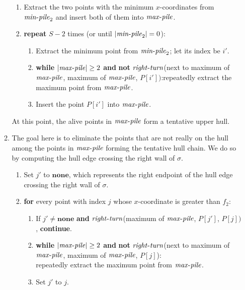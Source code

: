 \documentclass[final,onetabnum,onefignum,onethmnum]{siamltex}
\newcommand{\MinTwo}{\mbox{$\mathit{min}\mbox{\rm -}\mathit{pile}_2$}}
\newcommand{\MaxPile}{\mbox{$\mathit{max}\mbox{\rm -}\mathit{pile}$}}
\begin{document}
\begin{enumerate}
\begin{enumerate}
\begin{enumerate}
\item Extract the two points with the minimum $x$-coordinates 
from \MinTwo{} and insert both of them into \MaxPile{}.
\item \textbf{repeat} $S-2$ times (or until $|\MinTwo{}| = 0$): 
\begin{enumerate}
\item Extract the minimum point from \MinTwo{}; let its index be $i'$.
\item \textbf{while}  $|\MaxPile{}| \geq 2$
  \textbf{and} \textbf{not} $\mathit{right}\mbox{\rm
    -}\mathit{turn}$(next to maximum of \MaxPile{},  maximum of \MaxPile{}, $P[i'])$:\newline \hspace*{1.25em}repeatedly extract the maximum point from \MaxPile{}.
\item Insert the point $P[i']$ into \MaxPile{}.
\end{enumerate}
\end{enumerate}

At this point, the alive points in \MaxPile{} form a tentative upper hull.  

\item The goal here is to eliminate the points that are not really on the hull
among the points in \MaxPile{} forming the tentative hull chain. We do so by 
computing the hull edge crossing the right wall of $\sigma$.

\begin{enumerate}
\item Set $j'$ to $\mathbf{none}$, which represents the right endpoint of the hull edge crossing the right wall of $\sigma$.
\item \textbf{for} every point with index $j$ whose $x$-coordinate is
  greater than $f_2$:

\begin{enumerate}
\item If $j' \neq \mathbf{none}$ \textbf{and} $\mathit{right}\mbox{\rm
    -}\mathit{turn}$(maximum of \MaxPile{}, $P[j']$, $P[j])$, \textbf{continue}.
\item \textbf{while} $|\MaxPile{}| \geq 2$ \textbf{and} \textbf{not} $\mathit{right}\mbox{\rm
    -}\mathit{turn}$(next to maximum of \MaxPile{},  maximum of \MaxPile{},
$P[j]$):\\ \hspace*{1.25em}
repeatedly extract the maximum point from \MaxPile{}.\item Set $j'$ to $j$.
\end{enumerate}
\end{enumerate}


\end{enumerate}
\end{enumerate}
\end{document}
